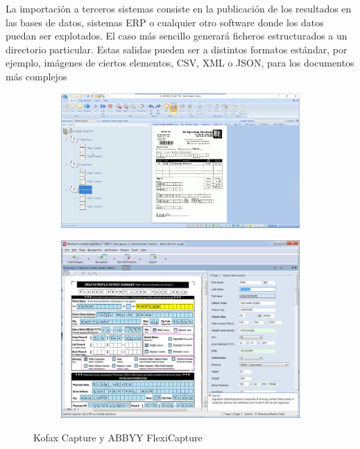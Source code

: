 \begin{itemize}
    La importación a terceros sistemas consiste en la publicación de los resultados en las bases de datos, sistemas ERP o cualquier otro software donde los datos puedan ser explotados. El caso más sencillo generará ficheros estructurados a un directorio particular. Estas salidas pueden ser a distintos formatos estándar, por ejemplo, imágenes de ciertos elementos, CSV, XML o JSON, para los documentos más complejos
\end{itemize}

\begin{figure}
    \centering
    \begin{subfigure}[b]{0.9\textwidth}
        \centering
        \includegraphics[width=\textwidth]{imaxes/b-estado-arte/kofax-capture}
        \label{fig:hough-punto-imagen}
    \end{subfigure}
    \begin{subfigure}[b]{0.9\textwidth}
        \centering
        \includegraphics[width=\textwidth]{imaxes/b-estado-arte/abbyy-flexicapture}
        \label{fig:hough-intersection}
    \end{subfigure}
    \caption{Kofax Capture y ABBYY FlexiCapture}
    \label{fig:kofax-capture-y-abbyy-flexicapture}
\end{figure}

